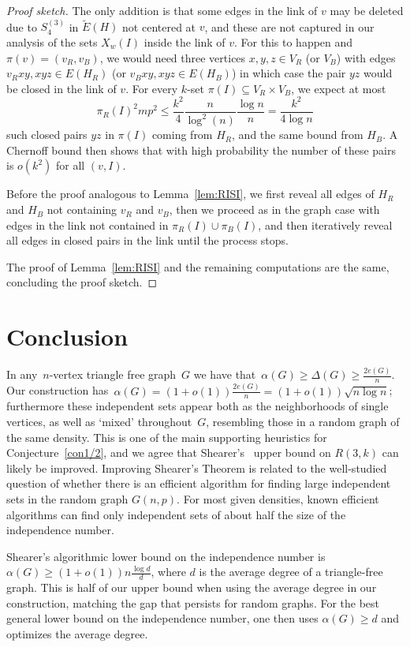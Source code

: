\documentclass{article}
\begin{document}
\begin{proof}[Proof sketch]
The only addition is that some edges in the link of $v$ may be deleted due to $S_4^{(3)}$ in $\tilde{E}(H)$ not centered at $v$, and these are not captured in our analysis of the sets $X_w(I)$ inside the link of $v$. For this to happen and $\pi(v)=(v_R,v_B)$, we would need three vertices $x,y,z\in V_R$ (or $V_B$) with edges $v_Rxy,xyz\in E(H_R)$ (or $v_Bxy,xyz\in E(H_B)$) in which case the pair $yz$ would be closed in the link of $v$. For every $k$-set $\pi(I)\subseteq V_R\times V_B$, we expect at most
\[
\pi_R(I)^2{m}p^2\le \frac{k^2}{4}\frac{n}{\log^2(n)}\frac{\log n}{n}=\frac{k^2}{4\log n}
\]
such closed pairs $yz$ in $\pi(I)$ coming from $H_R$, and the same bound from $H_B$. A Chernoff bound then shows that with high probability the number of these pairs is $o(k^2)$ for all $(v,I)$. 

Before the proof analogous to Lemma~\ref{lem:RISI}, we first reveal all edges of $H_R$ and $H_B$ not containing $v_R$ and $v_B$, then we proceed as in the graph case with edges in the link not contained in $\pi_R(I)\cup \pi_B(I)$, and then iteratively reveal all edges in closed pairs in the link until the process stops. 


The proof of Lemma~\ref{lem:RISI} and the remaining computations are the same, concluding the proof sketch.
\end{proof}


\section{Conclusion}

In any~$n$-vertex triangle free graph~$G$ we have that~$\alpha(G) \geq \Delta(G) \geq \frac{2e(G)}{n}$. Our construction has~$\alpha(G) = (1+o(1))\frac{2e(G)}{n} = (1+o(1))\sqrt{n \log n}$; furthermore these independent sets appear both as the neighborhoods of single vertices, as well as `mixed' throughout~$G$, resembling those in a random graph of the same density.
This is one of the main supporting heuristics for Conjecture~\ref{con1/2}, and we agree that Shearer's~\cite{Shearer83} upper bound on $R(3,k)$ can likely be improved. 
 Improving Shearer's Theorem is related to the well-studied question 
 of whether there is an efficient algorithm for finding large independent sets in the random graph $G(n,p)$. 
For most given densities, known efficient algorithms can find only independent sets of about half the size of the independence number.


Shearer's algorithmic lower bound on the independence number is
$\alpha(G)\ge (1+o(1)) n\frac{\log d}{d}$,
where $d$ is the average degree of a triangle-free graph.
This is half of our upper bound when using the average degree in our construction, matching the gap that persists for random graphs. For the best general lower bound on the independence number, one then
uses $\alpha(G)\ge d$ and optimizes the average degree.
 
\end{document}
